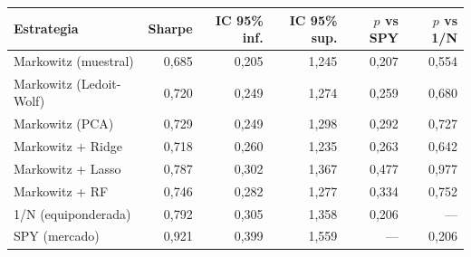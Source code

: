 \begin{tabular}{lrrrrr}
\toprule
Estrategia & Sharpe & IC 95\% inf. & IC 95\% sup. & $p$ vs SPY & $p$ vs 1/N \\
\midrule
Markowitz (muestral) & 0,685 & 0,205 & 1,245 & 0,207 & 0,554 \\
Markowitz (Ledoit-Wolf) & 0,720 & 0,249 & 1,274 & 0,259 & 0,680 \\
Markowitz (PCA) & 0,729 & 0,249 & 1,298 & 0,292 & 0,727 \\
Markowitz + Ridge & 0,718 & 0,260 & 1,235 & 0,263 & 0,642 \\
Markowitz + Lasso & 0,787 & 0,302 & 1,367 & 0,477 & 0,977 \\
Markowitz + RF & 0,746 & 0,282 & 1,277 & 0,334 & 0,752 \\
1/N (equiponderada) & 0,792 & 0,305 & 1,358 & 0,206 & --- \\
SPY (mercado) & 0,921 & 0,399 & 1,559 & --- & 0,206 \\
\bottomrule
\end{tabular}
